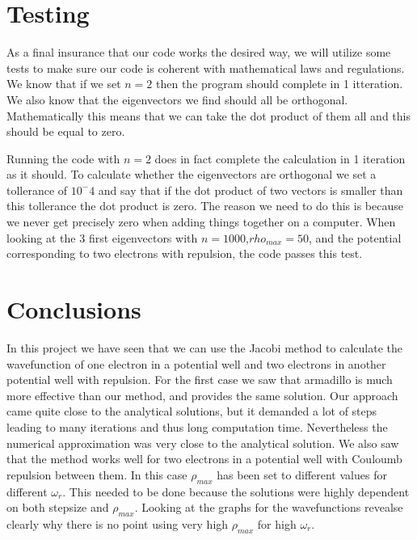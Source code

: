 \documentclass{aa}   %
\begin{document}
\section{Testing} \label{sec:testing}
As a final insurance that our code works the desired way, we will utilize some tests to make sure our code is coherent with mathematical laws and regulations. We know that if we set $n = 2$ then the program should complete in 1 itteration. We also know that the eigenvectors we find should all be orthogonal. Mathematically this means that we can take the dot product of them all and this should be equal to zero. 

Running the code with $n = 2$ does in fact complete the calculation in 1 iteration as it should.
To calculate whether the eigenvectors are orthogonal we set a tollerance of $10^-4$ and say that if the dot product of two vectors is smaller than this tollerance the dot product is zero. The reason we need to do this is because  we never get precisely zero when adding things together on a computer. When looking at the 3 first eigenvectors with $n = 1000$,$rho_{max} = 50$, and the potential corresponding to two electrons with repulsion, the code passes this test.

\section{Conclusions} \label{sec:conclusions}
In this project we have seen that we can use the Jacobi method to calculate the wavefunction of one electron in a potential well and two electrons in another potential well with repulsion. 
For the first case we saw that armadillo is much more effective than our method, and provides the same solution. Our approach came quite close to the analytical solutions, but it demanded a lot of steps leading to many iterations and thus long computation time. Nevertheless the numerical approximation was very close to the analytical solution.
We also saw that the method works well for two electrons in a potential well with Couloumb repulsion between them.
In this case $\rho_{max}$ has been set to different values for different $\omega_r$. This needed to be done because the solutions were highly dependent on both stepsize and $\rho_{max}$. Looking at the graphs for the wavefunctions revealse clearly why there is no point using very high $\rho_{max}$ for high $\omega_r$.
\end{document}
